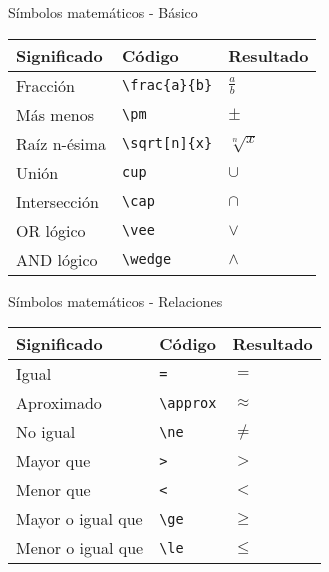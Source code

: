 \documentclass[
  ignorenonframetext,
]{beamer}
\begin{document}
\begin{frame}[fragile]{Símbolos matemáticos - Básico}
\protect\hypertarget{suxedmbolos-matemuxe1ticos---buxe1sico-1}{}
\begin{longtable}[]{@{}lll@{}}
\toprule
Significado & Código & Resultado \\
\midrule
\endhead
Fracción & \texttt{\textbackslash{}frac\{a\}\{b\}} & \(\frac{a}{b}\) \\
Más menos & \texttt{\textbackslash{}pm} & \(\pm\) \\
Raíz n-ésima & \texttt{\textbackslash{}sqrt{[}n{]}\{x\}} &
\(\sqrt[n]{x}\) \\
Unión & \texttt{cup} & \(\cup\) \\
Intersección & \texttt{\textbackslash{}cap} & \(\cap\) \\
OR lógico & \texttt{\textbackslash{}vee} & \(\vee\) \\
AND lógico & \texttt{\textbackslash{}wedge} & \(\wedge\) \\
\bottomrule
\end{longtable}
\end{frame}

\begin{frame}[fragile]{Símbolos matemáticos - Relaciones}
\protect\hypertarget{suxedmbolos-matemuxe1ticos---relaciones}{}
\begin{longtable}[]{@{}lll@{}}
\toprule
Significado & Código & Resultado \\
\midrule
\endhead
Igual & \texttt{=} & \(=\) \\
Aproximado & \texttt{\textbackslash{}approx} & \(\approx\) \\
No igual & \texttt{\textbackslash{}ne} & \(\ne\) \\
Mayor que & \texttt{\textgreater{}} & \(>\) \\
Menor que & \texttt{\textless{}} & \(<\) \\
Mayor o igual que & \texttt{\textbackslash{}ge} & \(\ge\) \\
Menor o igual que & \texttt{\textbackslash{}le} & \(\le\) \\
\bottomrule
\end{longtable}
\end{frame}
\end{document}
